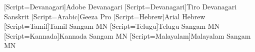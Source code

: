 %

\usepackage{fontspec}
\usepackage{caption}
\usepackage[normalem]{ulem}

\captionsetup[figure]{labelformat=empty}

\renewcommand{\topfraction}{0.9}
\renewcommand{\bottomfraction}{0.8}
\renewcommand{\textfraction}{0.1}
\renewcommand{\floatpagefraction}{0.85}

\newfontfamily{\devanagarifont}[Script=Devanagari]{Adobe Devanagari}
\newfontfamily{\vedicfont}[Script=Devanagari]{Tiro Devanagari Sanskrit}
\newfontfamily{\arabicfont}[Script=Arabic]{Geeza Pro}
\newfontfamily{\hebrewfont}[Script=Hebrew]{Arial Hebrew}
\newfontfamily{\tamilfont}[Script=Tamil]{Tamil Sangam MN}
\newfontfamily{\telugufont}[Script=Telugu]{Telugu Sangam MN}
\newfontfamily{\kannadafont}[Script=Kannada]{Kannada Sangam MN}
\newfontfamily{\malayalamfont}[Script=Malayalam]{Malayalam Sangam MN}

